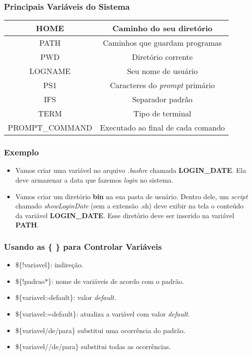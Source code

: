\documentclass{beamer}
\begin{document}
   \begin{frame}
      \frametitle{Principais Variáveis do Sistema}
      \begin{table}
         \begin{tabular}{c|c}
         HOME  & Caminho do seu diretório\\
         \hline
         PATH  & Caminhos que guardam programas\\
         \hline 
         PWD  & Diretório corrente\\
         \hline
         LOGNAME & Seu nome de usuário \\
         \hline 
         PS1  & Caracteres do \textit{prompt} primário\\
         \hline 
         IFS  & Separador padrão\\
         \hline 
         TERM  & Tipo de terminal \\
         \hline 
	 PROMPT\_COMMAND & Executado ao final de cada comando \\
         \end{tabular}
      \end{table}
   \end{frame}

   \begin{frame}
      \frametitle{Exemplo}
      \begin{itemize}
         \item Vamos criar uma variável no arquivo \textit{.bashrc} chamada \textbf{LOGIN\_DATE}. Ela deve armazenar a data que fazemos \textit{login} no sistema.
	 \item Vamos criar um diretório \textbf{bin} na sua pasta de usuário. Dentro dele, um \textit{script} chamado \textit{showLoginDate} (sem a extensão .sh) deve exibir na tela o conteúdo da variável \textbf{LOGIN\_DATE}. Esse diretório deve ser inserido na variável \textbf{PATH}.
      \end{itemize}
   \end{frame}

   \begin{frame}
      \frametitle{Usando as \{ \} para Controlar Variáveis}
      \begin{itemize}
         \item \$\{!variavel\}: indireção.
	 \item \$\{!padrao$*$\}: nome de variáveis de acordo com o padrão.
	 \item \$\{variavel:-default\}: valor \textit{default}.
	 \item \$\{variavel:=default\}: atualiza a variável com valor \textit{default}.
         \item \$\{variavel\slash de\slash para\} substitui uma ocorrência do padrão.
         \item \$\{variavel\slash\slash de\slash para\} substitui todas as ocorrências.
      \end{itemize}
   \end{frame}
 
\end{document}

